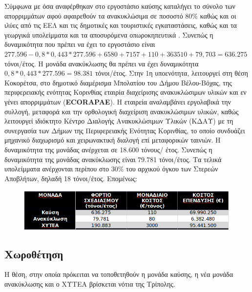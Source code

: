 \documentclass[12pt]{article}
\newcommand{\gr}{\selectlanguage{greek}}
\newcommand{\eng}{\selectlanguage{english}}
\begin{document}
 	Σύμφωνα με όσα αναφέρθηκαν στο εργοστάσιο καύσης καταλήγει το σύνολο των απορριμμάτων αφού αφαιρεθούν τα ανακυκλώσιμα σε ποσοστό 80\% καθώς και οι ιλύες από τις ΕΕΛ και τις δημοτικές και τουριστικές εγκαταστάσεις, καθώς και τα γεωργικά υπολείμματα και τα αποσυρόμενα οπωροκηπευτικά . Συνεπώς η δυναμικότητα που πρέπει να έχει το εργοστάσιο είναι $277.596-0,8*0,443*277.596+6580+7157+110+363510+79,703=636.275$τόνοι/έτος. Η μονάδα ανακύκλωσης θα πρέπει να έχει δυναμικότητα $0,8*0,443*277.596= 98.381$ τόνοι/έτος. Στην 1η υποενότητα, λειτουργεί στη θέση Κοκορέτσα, στο δημοτικό διαμέρισμα Μπολατίου του Δήμου Βέλου-Βόχας, της περιφερειακής ενότητας Κορινθίας εταιρία διαχείρισης ανακυκλώσιμων υλικών  και εν γένει απορριμμάτων (\textbf{\eng ECORAP\gr AE}). Η εταιρεία αναλαμβάνει εργολαβικά την συλλογή, μεταφορά και την ορθολογική διαχείριση ανακυκλώσιμων υλικών, καθώς λειτουργεί ιδιόκτητο Κέντρο Διαλογής Ανακυκλώσιμων Υλικών (ΚΔΑΥ) με τη συνεργασία των Δήμων της Περιφερειακής Ενότητας Κορινθίας, το οποίο συνδυάζει μηχανικό διαχωρισμό και χειρωνακτική διαλογή επί μεταφορικών ταινιών. Η δυναμικότητα της μονάδας ανέρχεται σε 18.600 τόνους/ έτος. Συνεπώς η δυναμικότητα της μονάδας ανακύκλωσης είναι 79.781 τόνοι/έτος. Τα τελικά υπολείμματα ανέρχονται περίπου στο 30\% του αρχικού όγκου των Στερεών Αποβλήτων, δηλαδή 18 τόνοι/έτος. Επομένως:
 	
 	\begin{figure} [H]
 		\begin{center}
 			\includegraphics [scale = 0.70] {table33.png}
 		\end{center}
 	\end{figure}
 
 	\subsection{Χωροθέτηση}
 	
 	Η θέση, στην οποία πρόκειται να τοποθετηθούν η μονάδα καύσης, η νέα μονάδα ανακύκλωσης και ο ΧΥΤΕΑ  βρίσκεται νότια της Τρίπολης.
 	
\end{document}
